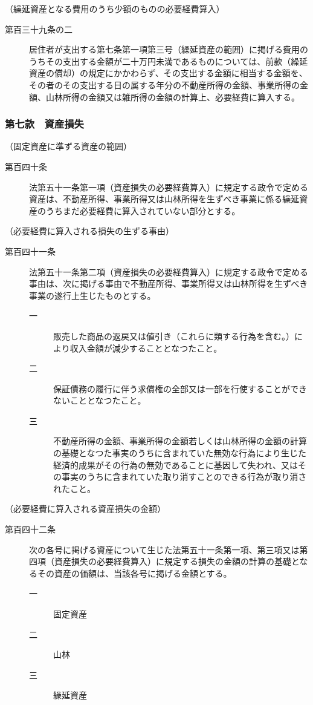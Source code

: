 \documentclass[twocolumn,a4j,10pt]{ltjtarticle}
\begin{document}
\noindent\hspace{10pt}（繰延資産となる費用のうち少額のものの必要経費算入）
\begin{description}
\item[第百三十九条の二]居住者が支出する第七条第一項第三号（繰延資産の範囲）に掲げる費用のうちその支出する金額が二十万円未満であるものについては、前款（繰延資産の償却）の規定にかかわらず、その支出する金額に相当する金額を、その者のその支出する日の属する年分の不動産所得の金額、事業所得の金額、山林所得の金額又は雑所得の金額の計算上、必要経費に算入する。
\end{description}
\subsubsection*{第七款　資産損失}
\noindent\hspace{10pt}（固定資産に準ずる資産の範囲）
\begin{description}
\item[第百四十条]法第五十一条第一項（資産損失の必要経費算入）に規定する政令で定める資産は、不動産所得、事業所得又は山林所得を生ずべき事業に係る繰延資産のうちまだ必要経費に算入されていない部分とする。
\end{description}
\noindent\hspace{10pt}（必要経費に算入される損失の生ずる事由）
\begin{description}
\item[第百四十一条]法第五十一条第二項（資産損失の必要経費算入）に規定する政令で定める事由は、次に掲げる事由で不動産所得、事業所得又は山林所得を生ずべき事業の遂行上生じたものとする。
\begin{description}
\item[一]販売した商品の返戻又は値引き（これらに類する行為を含む。）により収入金額が減少することとなつたこと。
\item[二]保証債務の履行に伴う求償権の全部又は一部を行使することができないこととなつたこと。
\item[三]不動産所得の金額、事業所得の金額若しくは山林所得の金額の計算の基礎となつた事実のうちに含まれていた無効な行為により生じた経済的成果がその行為の無効であることに基因して失われ、又はその事実のうちに含まれていた取り消すことのできる行為が取り消されたこと。
\end{description}
\end{description}
\noindent\hspace{10pt}（必要経費に算入される資産損失の金額）
\begin{description}
\item[第百四十二条]次の各号に掲げる資産について生じた法第五十一条第一項、第三項又は第四項（資産損失の必要経費算入）に規定する損失の金額の計算の基礎となるその資産の価額は、当該各号に掲げる金額とする。
\begin{description}
\item[一]固定資産
\item[二]山林
\item[三]繰延資産
\end{description}
\end{description}
\end{document}

